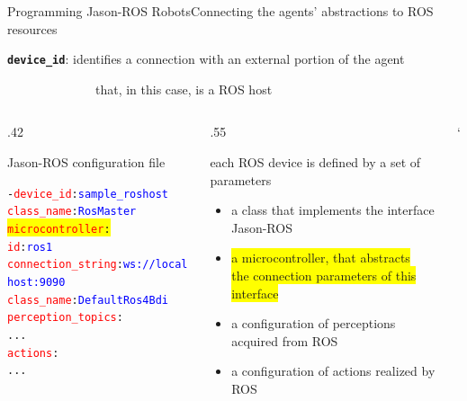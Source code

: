 \documentclass[compress]{beamer}
\newcommand{\yamlkey}[1]{\textcolor{red}{\texttt{#1}}}
\newcommand{\yamlvalue}[1]{\textcolor{blue}{\texttt{#1}}}
\begin{document}
\begin{frame}[fragile]{Programming Jason-ROS Robots}{Connecting the agents' abstractions to ROS resources}

    \footnotesize
    \texttt{{\bf device\_id}}: identifies a connection with an external portion of the agent\\ 
    
    \vspace{-.5cm}
    
    \ \ \ \ \ \ \ \ \ \ \ \ \ \ {\tiny that, in this case, is a ROS host}

    
    \begin{columns}
       \begin{column}{.42\textwidth}      
            \begin{block}{{\scriptsize Jason-ROS configuration file}}
                \scriptsize
                \begin{alltt} \tiny
- \yamlkey{device\_id}: \yamlvalue{sample\_roshost}
  \yamlkey{class_name}: \yamlvalue{RosMaster}
  \colorbox{yellow}{\yamlkey{microcontroller}:} 
    \yamlkey{id}: \yamlvalue{ros1} 
    \yamlkey{connection_string}: \yamlvalue{ws://localhost:9090} 
    \yamlkey{class_name}: \yamlvalue{DefaultRos4Bdi}
  \yamlkey{perception_topics}:         
    ...
  \yamlkey{actions}:       
    ...
                \end{alltt}

            \end{block}    
        \end{column}
        
        \hspace{-25pt} %
  
        \begin{column}{.55\textwidth} \scriptsize
  
            each ROS device is defined by a set of parameters
            \begin{itemize}\tiny
                \item a class that implements the interface Jason-ROS
                \item\colorbox{yellow}{ a microcontroller, that abstracts} \\ \colorbox{yellow}{the connection parameters of this interface}
                \item a configuration of perceptions acquired from ROS
                \item a configuration of actions realized by ROS
            \end{itemize}
        \end{column}`      
    \end{columns}
  

\end{frame}
\end{document}
